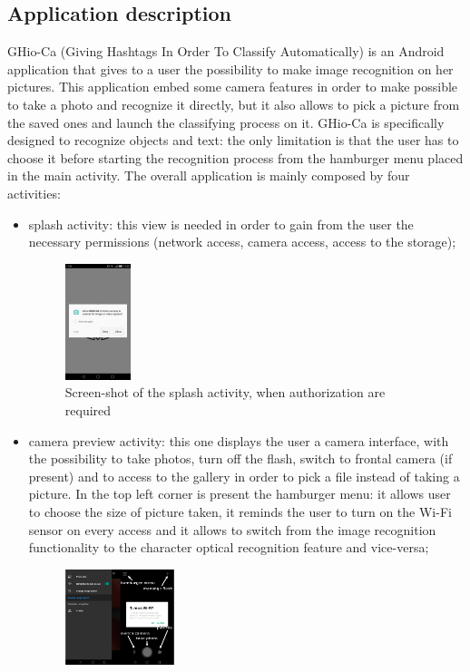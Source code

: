 \subsection{Application description}
GHio-Ca (Giving Hashtags In Order To Classify Automatically) is an Android
application that gives to a user the possibility to make image recognition on
her pictures. This application embed some camera features in order to make
possible to take a photo and recognize it directly, but it also allows to pick
a picture from the saved ones and launch the classifying process on it.
GHio-Ca is specifically designed to recognize objects and text: the only
limitation is that the user has to choose it before starting the
recognition process from the hamburger menu placed in the main activity.
The overall application is mainly composed by four activities:
\begin{itemize}
  \item splash activity: this view is needed in order to gain from the user
    the necessary permissions (network access, camera access, access to
    the storage);
    \begin{figure}[h]
        \centering
        \includegraphics[width=0.18\textwidth]{../img/splash}
        \caption{Screen-shot of the splash activity, when authorization are 
                 required}
        \label{fig:splash}
    \end{figure}
  \item camera preview activity: this one displays the user a camera
    interface, with the possibility to take photos, turn off the flash, switch
    to frontal camera (if present) and to access to the gallery in order to
    pick a file instead of taking a picture. In the top left corner is present
    the hamburger menu: it allows user to choose the size of picture taken,
    it reminds the user to turn on the Wi-Fi sensor on every access and it
    allows to switch from the image recognition functionality to the
    character optical recognition feature and vice-versa;
    \begin{figure}[h]
        \centering
        \includegraphics[width=0.30\textwidth]{../img/main_activity}

\end{figure}
\end{itemize}
